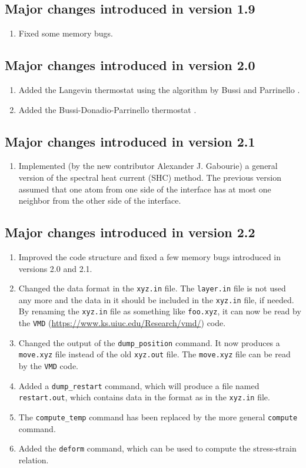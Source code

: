 \documentclass[12pt,a4paper]{report}
\begin{document}
\subsection{Major changes introduced in version 1.9}
\begin{enumerate}
\item Fixed some memory bugs.
\end{enumerate}

\subsection{Major changes introduced in version 2.0}
\begin{enumerate}
    \item Added the Langevin thermostat using the algorithm by Bussi and Parrinello \cite{bussi2007pre}.
    \item Added the Bussi-Donadio-Parrinello thermostat \cite{bussi2007jcp}.
\end{enumerate}

\subsection{Major changes introduced in version 2.1}
\begin{enumerate}
    \item Implemented (by the new contributor Alexander J. Gabourie) a general version of the spectral heat current (SHC) method. The previous version assumed that one atom from one side of the interface has at most one neighbor from the other side of the interface.
\end{enumerate}

\subsection{Major changes introduced in version 2.2}
\begin{enumerate}
    \item Improved the code structure and fixed a few memory bugs introduced in versions 2.0 and 2.1.
    \item Changed the data format in the \verb"xyz.in" file. The \verb"layer.in" file is not used any more and the data in it should be included in the \verb"xyz.in" file, if needed. By renaming the \verb"xyz.in" file as something like \verb"foo.xyz", it can now be read by the \verb"VMD" (\url{https://www.ks.uiuc.edu/Research/vmd/}) code.
    \item Changed the output of the  \verb"dump_position" command. It now produces a \verb"move.xyz" file instead of the old \verb"xyz.out" file. The \verb"move.xyz" file can be read by the \verb"VMD" code.
    \item Added a \verb"dump_restart" command, which will produce a file named \verb"restart.out", which contains data in the format as in the \verb"xyz.in" file.
    \item The \verb"compute_temp" command has been replaced by the more general \verb"compute" command.
    \item Added the \verb"deform" command, which can be used to compute the stress-strain relation.
\end{enumerate}
\end{document}

